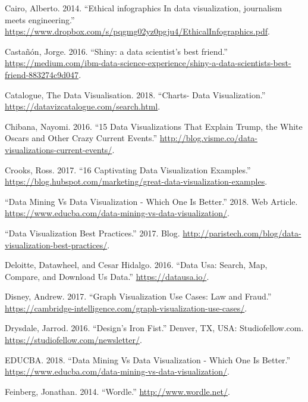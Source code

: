 \documentclass[]{book}
\begin{document}
\leavevmode\hypertarget{ref-ethical_infographics}{}%
Cairo, Alberto. 2014. ``Ethical infographics In data visualization, journalism meets engineering.'' \url{https://www.dropbox.com/s/pqgmg02yz0pgju4/EthicalInfographics.pdf}.

\leavevmode\hypertarget{ref-shiny_interactive_viz}{}%
Castañón, Jorge. 2016. ``Shiny: a data scientist's best friend.'' \url{https://medium.com/ibm-data-science-experience/shiny-a-data-scientists-best-friend-883274c9d047}.

\leavevmode\hypertarget{ref-charts_viz}{}%
Catalogue, The Data Visualisation. 2018. ``Charts- Data Visualization.'' \url{https://datavizcatalogue.com/search.html}.

\leavevmode\hypertarget{ref-int_viz_current}{}%
Chibana, Nayomi. 2016. ``15 Data Visualizations That Explain Trump, the White Oscars and Other Crazy Current Events.'' \url{http://blog.visme.co/data-visualizations-current-events/}.

\leavevmode\hypertarget{ref-int_viz_capt}{}%
Crooks, Ross. 2017. ``16 Captivating Data Visualization Examples.'' \url{https://blog.hubspot.com/marketing/great-data-visualization-examples}.

\leavevmode\hypertarget{ref-datamining_vs_viz}{}%
``Data Mining Vs Data Visualization - Which One Is Better.'' 2018. Web Article. \url{https://www.educba.com/data-mining-vs-data-visualization/}.

\leavevmode\hypertarget{ref-VizBP}{}%
``Data Visualization Best Practices.'' 2017. Blog. \url{http://paristech.com/blog/data-visualization-best-practices/}.

\leavevmode\hypertarget{ref-DataUSA}{}%
Deloitte, Datawheel, and Cesar Hidalgo. 2016. ``Data Usa: Search, Map, Compare, and Download Us Data.'' \url{https://datausa.io/}.

\leavevmode\hypertarget{ref-lawfraud}{}%
Disney, Andrew. 2017. ``Graph Visualization Use Cases: Law and Fraud.'' \url{https://cambridge-intelligence.com/graph-visualization-use-cases/}.

\leavevmode\hypertarget{ref-Design_Iron_Fist}{}%
Drysdale, Jarrod. 2016. ``Design's Iron Fist.'' Denver, TX, USA: Studiofellow.com. \url{https://studiofellow.com/newsletter/}.

\leavevmode\hypertarget{ref-data_mining}{}%
EDUCBA. 2018. ``Data Mining Vs Data Visualization - Which One Is Better.'' \url{https://www.educba.com/data-mining-vs-data-visualization/}.

\leavevmode\hypertarget{ref-wordle}{}%
Feinberg, Jonathan. 2014. ``Wordle.'' \url{http://www.wordle.net/}.
\end{document}
